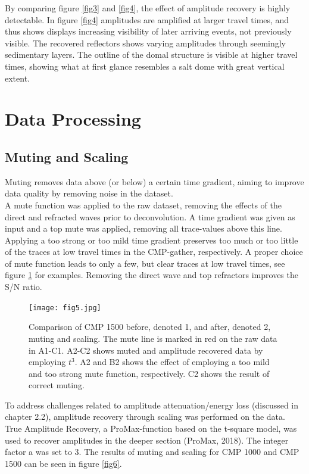 \documentclass[10pt,a4paper]{article}
\begin{document}
\noindent By comparing figure \ref{fig3} and \ref{fig4}, the effect of amplitude recovery is highly detectable. In figure \ref{fig4} amplitudes are amplified at larger travel times, and thus shows displays increasing visibility of later arriving events, not previously visible. The recovered reflectors shows varying amplitudes through seemingly sedimentary layers. The outline of the domal structure is visible at higher travel times, showing what at first glance resembles a salt dome with great vertical extent.

\section{Data Processing}

\subsection{Muting and Scaling}

Muting removes data above (or below) a certain time gradient, aiming to improve data quality by removing noise in the dataset.
\\
A mute function was applied to the raw dataset, removing the effects of the direct and refracted waves prior to deconvolution. A time gradient was given as input and a top mute was applied, removing all trace-values above this line. Applying a too strong or too mild time gradient preserves too much or too little of the traces at low travel times in the CMP-gather, respectively. A proper choice of mute function leads to only a few, but clear traces at low travel times, see figure \ref{fig5} for examples. Removing the direct wave and top refractors improves the S/N ratio.


\begin{figure}[H]
\texttt{[image: fig5.jpg]}
\caption{Comparison of CMP 1500 before, denoted 1, and after, denoted 2, muting and scaling. The mute line is marked in red on the raw data in A1-C1. A2-C2 shows muted and amplitude recovered data by employing $t^3$. A2 and B2 shows the effect of employing a too mild and too strong mute function, respectively. C2 shows the result of correct muting.}
\label{fig5}
\end{figure}


\noindent To address challenges related to amplitude attenuation/energy loss (discussed in chapter 2.2), amplitude recovery through scaling was performed on the data. True Amplitude Recovery, a ProMax-function based on the t-square model, was used to recover amplitudes in the deeper section (ProMax, 2018). The integer factor a was set to 3. The results of muting and scaling for CMP 1000 and CMP 1500 can be seen in figure \ref{fig6}.  
\end{document}
